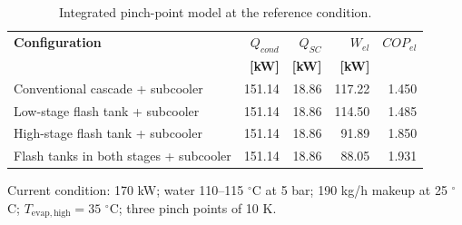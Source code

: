 \begin{table}[htbp]
\centering
\caption{Integrated pinch-point model at the reference condition.}
\label{tab:integrated_pinch_validation}
\small
\begin{tabular}{lrrrr}
\hline
\textbf{Configuration} & \textbf{$Q_{cond}$} & \textbf{$Q_{SC}$} & \textbf{$W_{el}$} & \textbf{$COP_{el}$} \\
 & \textbf{[kW]} & \textbf{[kW]} & \textbf{[kW]} & \\
\hline
Conventional cascade + subcooler & 151.14 & 18.86 & 117.22 & 1.450 \\
Low-stage flash tank + subcooler & 151.14 & 18.86 & 114.50 & 1.485 \\
High-stage flash tank + subcooler & 151.14 & 18.86 & 91.89 & 1.850 \\
Flash tanks in both stages + subcooler & 151.14 & 18.86 & 88.05 & 1.931 \\
\hline
\end{tabular}

\vspace{1.5mm}
\begin{minipage}{0.98\linewidth}
\footnotesize
Current condition: 170 kW; water 110--115 $^{\circ}$C at 5 bar; 190 kg/h makeup at 25 $^{\circ}$C; $T_{\mathrm{evap,high}}=35$ $^{\circ}$C; three pinch points of 10 K.
\end{minipage}
\end{table}
